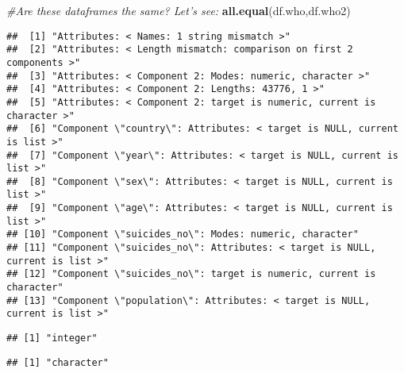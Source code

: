 \documentclass[]{article}
\newenvironment{Shaded}{\begin{snugshade}}{\end{snugshade}}
\newcommand{\KeywordTok}[1]{\textcolor[rgb]{0.13,0.29,0.53}{\textbf{#1}}}
\newcommand{\CommentTok}[1]{\textcolor[rgb]{0.56,0.35,0.01}{\textit{#1}}}
\newcommand{\OperatorTok}[1]{\textcolor[rgb]{0.81,0.36,0.00}{\textbf{#1}}}
\newcommand{\NormalTok}[1]{#1}
\begin{document}
\begin{Shaded}
\begin{Highlighting}[]
\CommentTok{#Are these dataframes the same? Let's see:}
 \KeywordTok{all.equal}\NormalTok{(df.who,df.who2)}
\end{Highlighting}
\end{Shaded}

\begin{verbatim}
##  [1] "Attributes: < Names: 1 string mismatch >"                                  
##  [2] "Attributes: < Length mismatch: comparison on first 2 components >"         
##  [3] "Attributes: < Component 2: Modes: numeric, character >"                    
##  [4] "Attributes: < Component 2: Lengths: 43776, 1 >"                            
##  [5] "Attributes: < Component 2: target is numeric, current is character >"      
##  [6] "Component \"country\": Attributes: < target is NULL, current is list >"    
##  [7] "Component \"year\": Attributes: < target is NULL, current is list >"       
##  [8] "Component \"sex\": Attributes: < target is NULL, current is list >"        
##  [9] "Component \"age\": Attributes: < target is NULL, current is list >"        
## [10] "Component \"suicides_no\": Modes: numeric, character"                      
## [11] "Component \"suicides_no\": Attributes: < target is NULL, current is list >"
## [12] "Component \"suicides_no\": target is numeric, current is character"        
## [13] "Component \"population\": Attributes: < target is NULL, current is list >"
\end{verbatim}

\begin{Shaded}
\end{Shaded}

\begin{verbatim}
## [1] "integer"
\end{verbatim}

\begin{Shaded}
\end{Shaded}

\begin{verbatim}
## [1] "character"
\end{verbatim}
\end{document}
